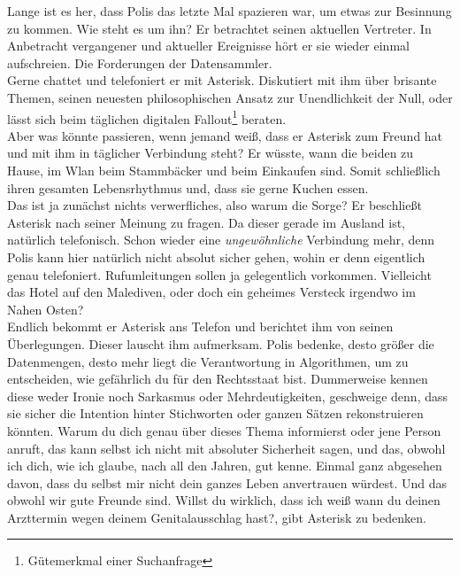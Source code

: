 



Lange ist es her, dass Polis das letzte Mal spazieren war, um etwas zur Besinnung zu kommen. Wie steht es um ihn? Er betrachtet seinen aktuellen Vertreter. In Anbetracht vergangener und aktueller Ereignisse hört er sie wieder einmal aufschreien. Die Forderungen der Datensammler.
\\
Gerne chattet und telefoniert er mit Asterisk. Diskutiert mit ihm über brisante Themen, seinen neuesten philosophischen Ansatz zur Unendlichkeit der Null, oder lässt sich beim täglichen digitalen Fallout\footnote{Gütemerkmal einer Suchanfrage} beraten.
\\
Aber was könnte passieren, wenn jemand weiß, dass er Asterisk zum Freund hat und mit ihm in täglicher Verbindung steht? Er wüsste, wann die beiden zu Hause, im Wlan beim Stammbäcker und beim Einkaufen sind. Somit schließlich ihren gesamten Lebensrhythmus und, dass sie gerne Kuchen essen.
\\
Das ist ja zunächst nichts verwerfliches, also warum die Sorge? Er beschließt Asterisk nach seiner Meinung zu fragen. Da dieser gerade im Ausland ist, natürlich telefonisch. Schon wieder eine \textit{ungewöhnliche} Verbindung mehr, denn Polis kann hier natürlich nicht absolut sicher gehen, wohin er denn eigentlich genau telefoniert. Rufumleitungen sollen ja gelegentlich vorkommen. Vielleicht das Hotel auf den Malediven, oder doch ein geheimes Versteck irgendwo im Nahen Osten?
\\
Endlich bekommt er Asterisk ans Telefon und berichtet ihm von seinen Überlegungen. Dieser lauscht ihm aufmerksam. \glqq Polis bedenke, desto größer die Datenmengen, desto mehr liegt die Verantwortung in Algorithmen, um zu entscheiden, wie gefährlich du für den Rechtsstaat bist. Dummerweise kennen diese weder Ironie noch Sarkasmus oder Mehrdeutigkeiten, geschweige denn, dass sie sicher die Intention hinter Stichworten oder ganzen Sätzen rekonstruieren könnten. Warum du dich genau über dieses Thema informierst oder jene Person anruft, das kann selbst ich nicht mit absoluter Sicherheit sagen, und das, obwohl ich dich, wie ich glaube, nach all den Jahren, gut kenne. Einmal ganz abgesehen davon, dass du selbst mir nicht dein ganzes Leben anvertrauen würdest. Und das obwohl wir gute Freunde sind. Willst du wirklich, dass ich weiß wann du deinen Arzttermin wegen deinem Genitalausschlag hast?\grqq, gibt Asterisk zu bedenken.

